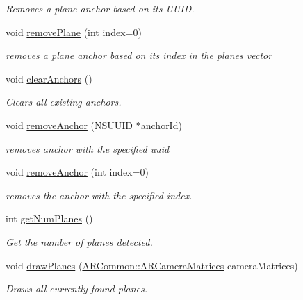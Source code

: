 \begin{DoxyCompactItemize}
\begin{DoxyCompactList}\small\item\em Removes a plane anchor based on it\textquotesingle{}s U\+U\+ID. \end{DoxyCompactList}\item 
void \hyperlink{class_a_r_core_1_1_a_r_anchor_manager_a7d01736351089d31708ca4c577da99a4}{remove\+Plane} (int index=0)
\begin{DoxyCompactList}\small\item\em removes a plane anchor based on it\textquotesingle{}s index in the planes vector \end{DoxyCompactList}\item 
void \hyperlink{class_a_r_core_1_1_a_r_anchor_manager_af78ff242457a15c5073b8a2557a96974}{clear\+Anchors} ()
\begin{DoxyCompactList}\small\item\em Clears all existing anchors. \end{DoxyCompactList}\item 
void \hyperlink{class_a_r_core_1_1_a_r_anchor_manager_a28ed88e530bc1991e59f26e6b580d5c5}{remove\+Anchor} (N\+S\+U\+U\+ID $\ast$anchor\+Id)
\begin{DoxyCompactList}\small\item\em removes anchor with the specified uuid \end{DoxyCompactList}\item 
void \hyperlink{class_a_r_core_1_1_a_r_anchor_manager_a471d6e5694d6aecb810b65a909cf72b1}{remove\+Anchor} (int index=0)
\begin{DoxyCompactList}\small\item\em removes the anchor with the specified index. \end{DoxyCompactList}\item 
int \hyperlink{class_a_r_core_1_1_a_r_anchor_manager_a1da3445edbf4474d1207d30b691cfb4f}{get\+Num\+Planes} ()
\begin{DoxyCompactList}\small\item\em Get the number of planes detected. \end{DoxyCompactList}\item 
void \hyperlink{class_a_r_core_1_1_a_r_anchor_manager_a7ec2178e8754fa04b00cc600c60cb852}{draw\+Planes} (\hyperlink{struct_a_r_common_1_1_a_r_camera_matrices}{A\+R\+Common\+::\+A\+R\+Camera\+Matrices} camera\+Matrices)
\begin{DoxyCompactList}\small\item\em Draws all currently found planes. \end{DoxyCompactList}\item 

\end{DoxyCompactItemize}
